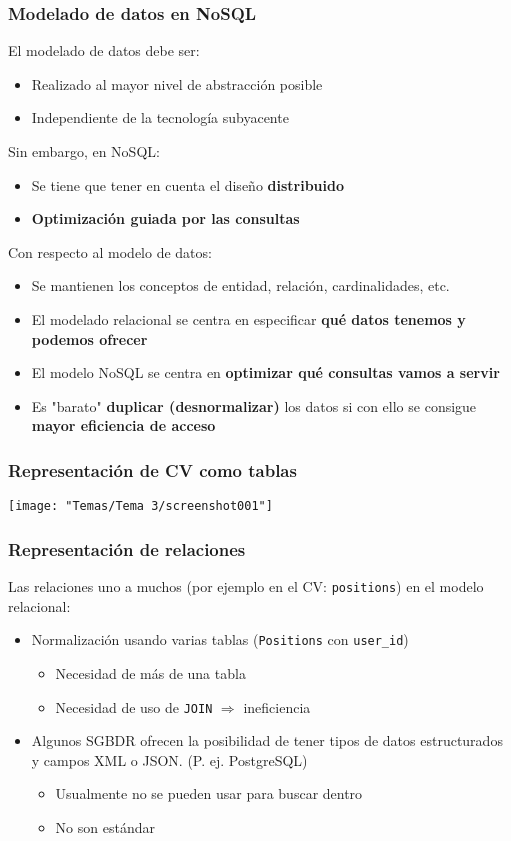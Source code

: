 \subsubsection{Modelado de datos en NoSQL}
El modelado de datos debe ser:
\begin{itemize}
\item Realizado al mayor nivel de abstracción posible
\item Independiente de la tecnología subyacente
\end{itemize}
Sin embargo, en NoSQL:
\begin{itemize}
\item  Se tiene que tener en cuenta el diseño \textbf{distribuido}
\item \textbf{Optimización guiada por las consultas}
\end{itemize}
Con respecto al modelo de datos:
\begin{itemize}
\item Se mantienen los conceptos de entidad, relación, cardinalidades, etc.
\item El modelado relacional se centra en especificar \textbf{qué datos tenemos y podemos ofrecer}
\item El modelo NoSQL se centra en \textbf{optimizar qué consultas vamos a servir}
\item Es "barato" \textbf{duplicar (desnormalizar)} los datos si con ello se consigue \textbf{mayor eficiencia de acceso}
\end{itemize}
\subsubsection{Representación de CV como tablas}
\begin{center}
	\texttt{[image: "Temas/Tema 3/screenshot001"]}
\end{center}
\subsubsection{Representación de relaciones}
Las relaciones uno a muchos (por ejemplo en el CV: \texttt{positions}) en el modelo relacional:
\begin{itemize}
	\item Normalización usando varias tablas (\texttt{Positions} con \texttt{user_id})
\begin{itemize}
	\item Necesidad de más de una tabla
\item Necesidad de uso de \texttt{JOIN} $\Rightarrow$ ineficiencia
\end{itemize}
\item Algunos SGBDR ofrecen la posibilidad de tener tipos de datos estructurados y campos XML o JSON. (P. ej. PostgreSQL)
\begin{itemize}
	\item Usualmente no se pueden usar para buscar dentro
\item No son estándar
\end{itemize}
\end{itemize}
